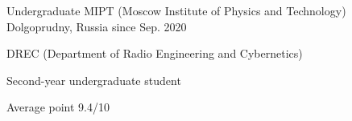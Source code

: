
\begin{cventries}

  \cventry
    {Undergraduate} %
    {MIPT (Moscow Institute of Physics and Technology)} %
    {Dolgoprudny, Russia} %
    {since Sep. 2020} %
    {
      \begin{cvitems} %
        \item {DREC (Department of Radio Engineering and Cybernetics)}
        \item {Second-year undergraduate student}
        \item {Average point 9.4/10}
      \end{cvitems}
    }

\end{cventries}
